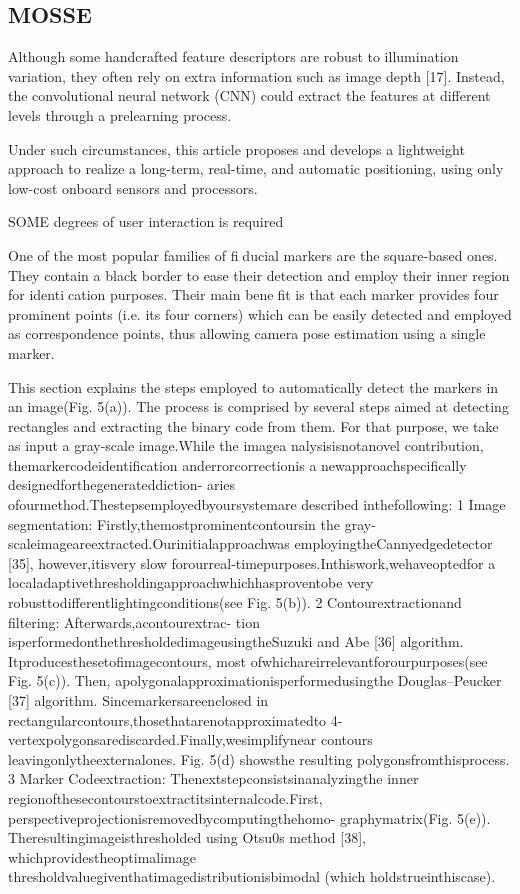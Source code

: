 \documentclass[a4paper]{report}
\begin{document}
\subsection{MOSSE}



Although some handcrafted feature descriptors are robust to illumination variation, they often rely on extra information such as image depth [17]. Instead, the
convolutional neural network (CNN) could extract the features
at different levels through a prelearning process.

Under such circumstances, this article proposes and develops
a lightweight approach to realize a long-term, real-time, and
automatic positioning, using only low-cost onboard sensors and
processors.


SOME degrees of user interaction is required



One of the most popular families of fiducial markers are
the square-based ones. They contain a black border to ease
their detection and employ their inner region for identication
purposes. Their main benefit is that each marker provides
four prominent points (i.e. its four corners) which can
be easily detected and employed as correspondence points,
thus allowing camera pose estimation using a single marker.



This section explains the steps employed to automatically
detect the markers in an image(Fig. 5(a)). The process is
comprised by several steps aimed at detecting rectangles and
extracting the binary code from them. For that purpose, we take as
input a gray-scale image.While the imagea nalysisisnotanovel
contribution, themarkercodeidentification anderrorcorrectionis
a newapproachspecifically designedforthegenerateddiction-
aries ofourmethod.Thestepsemployedbyoursystemare
described inthefollowing:
1 Image segmentation: Firstly,themostprominentcontoursin
the gray-scaleimageareextracted.Ourinitialapproachwas
employingtheCannyedgedetector [35], however,itisvery
slow forourreal-timepurposes.Inthiswork,wehaveoptedfor
a localadaptivethresholdingapproachwhichhasproventobe
very robusttodifferentlightingconditions(see Fig. 5(b)).
2 Contourextractionand filtering: Afterwards,acontourextrac-
tion isperformedonthethresholdedimageusingtheSuzuki
and Abe [36] algorithm. Itproducesthesetofimagecontours,
most ofwhichareirrelevantforourpurposes(see Fig. 5(c)).
Then, apolygonalapproximationisperformedusingthe
Douglas–Peucker [37] algorithm. Sincemarkersareenclosed
in rectangularcontours,thosethatarenotapproximatedto
4-vertexpolygonsarediscarded.Finally,wesimplifynear
contours leavingonlytheexternalones. Fig. 5(d) showsthe
resulting polygonsfromthisprocess.
3 Marker Codeextraction: Thenextstepconsistsinanalyzingthe
inner regionofthesecontourstoextractitsinternalcode.First,
perspectiveprojectionisremovedbycomputingthehomo-
graphymatrix(Fig. 5(e)). Theresultingimageisthresholded
using Otsu0s method [38], whichprovidestheoptimalimage
thresholdvaluegiventhatimagedistributionisbimodal
(which holdstrueinthiscase).
\end{document}
